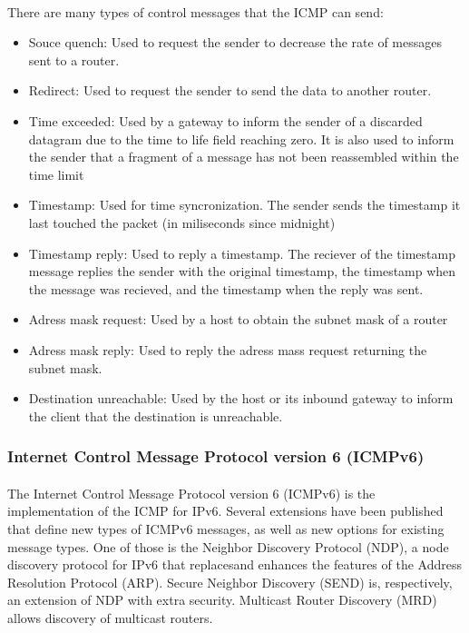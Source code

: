 \documentclass[12pt,a4paper]{report}
\begin{document}
\paragraph{}There are many types of control messages that the ICMP can send:
\begin{itemize}
\item Souce quench: Used to request the sender to decrease the rate of messages sent to a router.
\item Redirect: Used to request the sender to send the data to another router.
\item Time exceeded: Used by a gateway to inform the sender of a discarded datagram due to the time to life field reaching zero. It is also used to inform the sender that a fragment of a message has not been reassembled within the time limit
\item Timestamp: Used for time syncronization. The sender sends the timestamp it last touched the packet (in miliseconds since midnight)
\item Timestamp reply: Used to reply a timestamp. The reciever of the timestamp message replies the sender with the original timestamp, the timestamp when the message was recieved, and the timestamp when the reply was sent.
\item Adress mask request: Used by a host to obtain the subnet mask of a router
\item Adress mask reply: Used to reply the adress mass request returning the subnet mask.
\item Destination unreachable: Used by the host or its inbound gateway to inform the client that the destination is unreachable.
\end{itemize}

\subsubsection{Internet Control Message Protocol version 6 (ICMPv6)\cite{ICMPv6}}
\paragraph{}The Internet Control Message Protocol version 6 (ICMPv6) is the implementation of the ICMP for IPv6. Several extensions have been published that define new types of ICMPv6 messages, as well as new options for existing message types. One of those is the Neighbor Discovery Protocol (NDP), a node discovery protocol for IPv6 that replacesand enhances the features of the Address Resolution Protocol (ARP). Secure Neighbor Discovery (SEND) is, respectively, an extension of NDP with extra security. Multicast Router Discovery (MRD) allows discovery of multicast routers.
\end{document}
